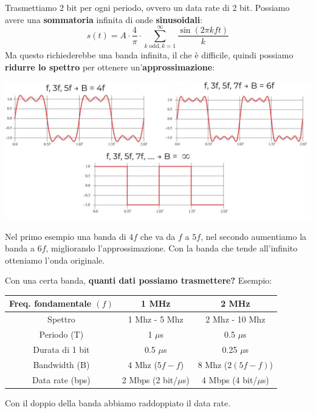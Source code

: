Trasmettiamo 2 bit per ogni periodo, ovvero un data rate di 2 bit. Possiamo avere una \textbf{sommatoria} infinita di onde \textbf{sinusoidali}: 
$$ s(t) = A \cdot \frac{4}{\pi} \cdot \sum_{k \text{ odd}, k=1}^{\infty} \frac{\sin (2 \pi kft)}{k} $$
Ma questo richiederebbe una banda infinita, il che è difficile, quindi possiamo \textbf{ridurre lo spettro} per ottenere un'\textbf{approssimazione}: 
\begin{center}
	\includegraphics[width=\linewidth]{img/PTT/fourier1m}
\end{center}

Nel primo esempio una banda di $4f$ che va da $f$ a $5f$, nel secondo aumentiamo la banda a $6f$, migliorando l'approssimazione.
Con la banda che tende all'infinito otteniamo l'onda originale.

\newpage

Con una certa banda, \textbf{quanti dati possiamo trasmettere?} Esempio: 
\begin{center}
	\begin{tabular}{| c | c | c |}
		\hline
		Freq. fondamentale $(f)$ & 1 MHz & 2 MHz \\
		\hline
		Spettro & 1 Mhz - 5 Mhz & 2 Mhz - 10 Mhz \\
		\hline
		Periodo (T) & 1 $\mu$s & 0.5 $\mu$s \\
		\hline 
		Durata di 1 bit & 0.5 $\mu$s & 0.25 $\mu$s \\
		\hline
		Bandwidth (B) & 4 Mhz ($5f - f$) & 8 Mhz ($2(5f - f)$) \\
		\hline
		Data rate (bps) & 2 Mbps (2 bit/$\mu$s) & 4 Mbps (4 bit/$\mu$s) \\ 
		\hline
	\end{tabular}
\end{center}
Con il doppio della banda abbiamo raddoppiato il data rate.\\

